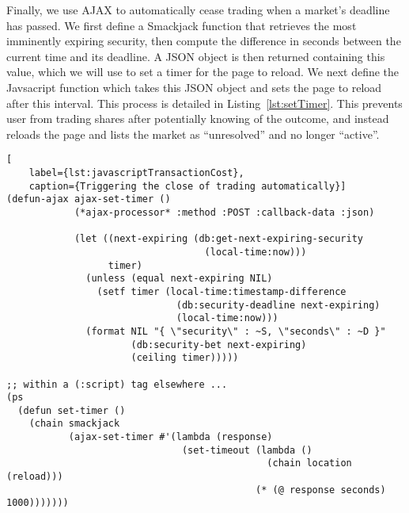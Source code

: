 Finally, we use AJAX to automatically cease trading when a market's deadline
has passed. We first define a Smackjack function that retrieves the most
imminently expiring security, then compute the difference in seconds between
the current time and its deadline. A JSON object is then returned containing
this value, which we will use to set a timer for the page to reload. We next
define the Javsacript function  which takes this JSON object
and sets the page to reload after this interval. This process is detailed in
Listing~\ref{lst:setTimer}. This prevents user from trading shares after
potentially knowing of the outcome, and instead reloads the page and lists the
market as ``unresolved'' and no longer ``active''.

\begin{lstlisting}[
	label={lst:javascriptTransactionCost},
	caption={Triggering the close of trading automatically}]
(defun-ajax ajax-set-timer ()
			(*ajax-processor* :method :POST :callback-data :json)

			(let ((next-expiring (db:get-next-expiring-security
								   (local-time:now)))
				  timer)
			  (unless (equal next-expiring NIL)
				(setf timer (local-time:timestamp-difference
							  (db:security-deadline next-expiring)
							  (local-time:now)))
			  (format NIL "{ \"security\" : ~S, \"seconds\" : ~D }"
					  (db:security-bet next-expiring)
					  (ceiling timer)))))

;; within a (:script) tag elsewhere ...
(ps
  (defun set-timer ()
	(chain smackjack
		   (ajax-set-timer #'(lambda (response)
							   (set-timeout (lambda ()
											  (chain location (reload)))
									 		(* (@ response seconds) 1000)))))))
\end{lstlisting}

